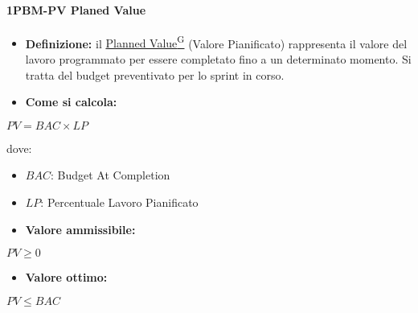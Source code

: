 \paragraph*{1PBM-PV Planed Value}
\begin{itemize}
    \item \textbf{Definizione:} il \href{https://code7crusaders.github.io/docs/RTB/documentazione_interna/glossario.html#planned-value}{Planned Value\textsuperscript{G}} (Valore Pianificato) rappresenta il valore del lavoro programmato per essere completato fino a un determinato momento. Si tratta del budget preventivato per lo sprint in corso.
    \item \textbf{Come si calcola:}
\end{itemize}
\begin{center}
   $PV = BAC \times LP$ 
\end{center}
dove:
\begin{itemize}[label=$\rightarrow$]
    \item $BAC$: Budget At Completion
    \item $LP$: Percentuale Lavoro Pianificato
\end{itemize}
\begin{itemize}
    \item \textbf{Valore ammissibile:}
\end{itemize}
\begin{center}
    $PV \geq 0$
\end{center}
\begin{itemize}
    \item \textbf{Valore ottimo:}
\end{itemize}
\begin{center}
    $PV \leq BAC$
\end{center}

